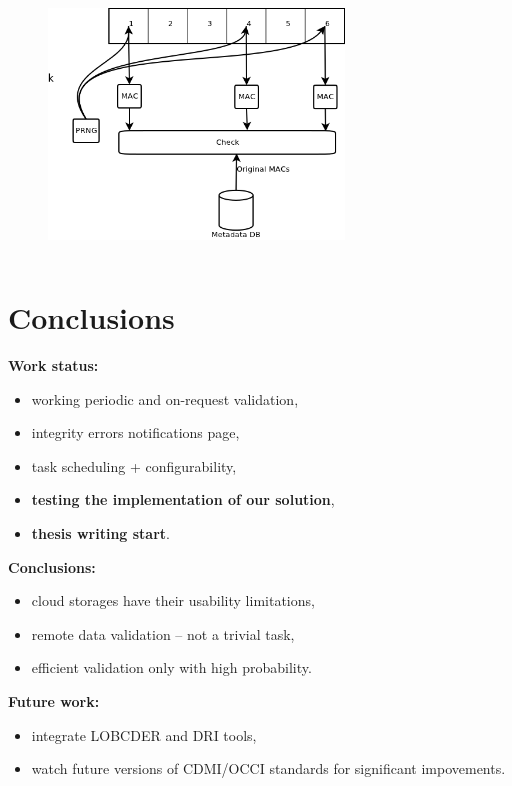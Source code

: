 \documentclass[compress]{beamer}
\begin{document}
\begin{frame}
\begin{columns}
\begin{column}{0.5\textwidth}
\begin{figure}
			\vspace{0.5cm}
			\includegraphics[width=0.7\textwidth]{img/solution-validation.png}
		\end{figure}
	\end{column}
\end{columns}
\end{frame}



\section{Conclusions}
\begin{frame}
\begin{block}{\textbf{Work status:}}
\begin{itemize}
	\item working periodic and on-request validation,
	\item integrity errors notifications page,
	\item task scheduling + configurability,
	\item \textbf{testing the implementation of our solution},
	\item \textbf{thesis writing start}.
\end{itemize}
\end{block}
\begin{exampleblock}{\textbf{Conclusions:}}
	\begin{itemize}
		\item cloud storages have their usability limitations,
		\item remote data validation -- not a trivial task,
		\item efficient validation only with high probability.
	\end{itemize}
\end{exampleblock}
\begin{block}{\textbf{Future work:}}
\begin{itemize}
	\item integrate LOBCDER and DRI tools,
	\item watch future versions of CDMI/OCCI standards for significant impovements. 
\end{itemize}
\end{block}
\end{frame}
\end{document}
